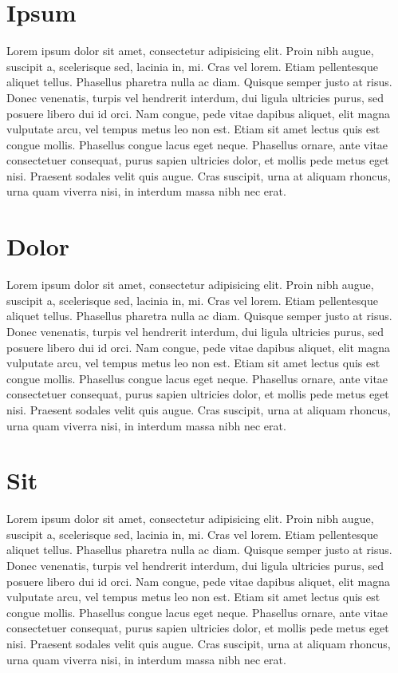 \documentclass{mini}
\begin{document}
\section{Ipsum}

Lorem ipsum dolor sit amet, consectetur adipisicing elit. Proin nibh augue, suscipit a, scelerisque sed, lacinia in, mi. Cras vel lorem. Etiam pellentesque aliquet tellus. Phasellus pharetra nulla ac diam. Quisque semper justo at risus. Donec venenatis, turpis vel hendrerit interdum, dui ligula ultricies purus, sed posuere libero dui id orci. Nam congue, pede vitae dapibus aliquet, elit magna vulputate arcu, vel tempus metus leo non est. Etiam sit amet lectus quis est congue mollis. Phasellus congue lacus eget neque. Phasellus ornare, ante vitae consectetuer consequat, purus sapien ultricies dolor, et mollis pede metus eget nisi. Praesent sodales velit quis augue. Cras suscipit, urna at aliquam rhoncus, urna quam viverra nisi, in interdum massa nibh nec erat.

\section{Dolor}

Lorem ipsum dolor sit amet, consectetur adipisicing elit. Proin nibh augue, suscipit a, scelerisque sed, lacinia in, mi. Cras vel lorem. Etiam pellentesque aliquet tellus. Phasellus pharetra nulla ac diam. Quisque semper justo at risus. Donec venenatis, turpis vel hendrerit interdum, dui ligula ultricies purus, sed posuere libero dui id orci. Nam congue, pede vitae dapibus aliquet, elit magna vulputate arcu, vel tempus metus leo non est. Etiam sit amet lectus quis est congue mollis. Phasellus congue lacus eget neque. Phasellus ornare, ante vitae consectetuer consequat, purus sapien ultricies dolor, et mollis pede metus eget nisi. Praesent sodales velit quis augue. Cras suscipit, urna at aliquam rhoncus, urna quam viverra nisi, in interdum massa nibh nec erat.

\section{Sit}

Lorem ipsum dolor sit amet, consectetur adipisicing elit. Proin nibh augue, suscipit a, scelerisque sed, lacinia in, mi. Cras vel lorem. Etiam pellentesque aliquet tellus. Phasellus pharetra nulla ac diam. Quisque semper justo at risus. Donec venenatis, turpis vel hendrerit interdum, dui ligula ultricies purus, sed posuere libero dui id orci. Nam congue, pede vitae dapibus aliquet, elit magna vulputate arcu, vel tempus metus leo non est. Etiam sit amet lectus quis est congue mollis. Phasellus congue lacus eget neque. Phasellus ornare, ante vitae consectetuer consequat, purus sapien ultricies dolor, et mollis pede metus eget nisi. Praesent sodales velit quis augue. Cras suscipit, urna at aliquam rhoncus, urna quam viverra nisi, in interdum massa nibh nec erat.
\end{document}

